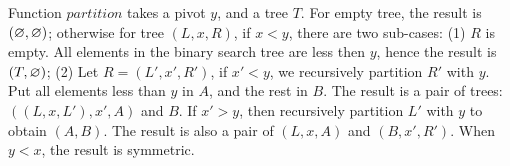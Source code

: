 \documentclass[b5paper]{article}
\begin{document}
\be
{}
\ee

Function $partition$ takes a pivot $y$, and a tree $T$. For empty tree, the result is $(\varnothing, \varnothing)$; otherwise for tree $(L, x, R)$, if $x < y$, there are two sub-cases: (1) $R$ is empty. All elements in the binary search tree are less then $y$, hence the result is $(T, \varnothing)$; (2) Let $R = (L', x', R')$, if $x' < y$, we recursively partition $R'$ with $y$. Put all elements less than $y$ in $A$, and the rest in $B$. The result is a pair of trees: $((L, x, L'), x', A)$ and $B$. If $x' > y$, then recursively partition $L'$ with $y$ to obtain $(A, B)$. The result is also a pair of $(L, x, A)$ and $(B, x', R')$. When $y < x$, the result is symmetric.
\end{document}
